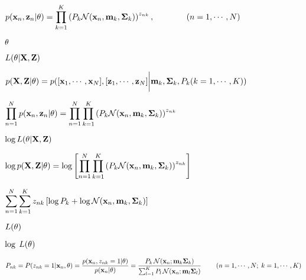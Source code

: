 \documentclass{article}
\def\lthtmlcheckvsize{\ifdim\ht\sizebox<\vsize 
  \ifdim\wd\sizebox<\hsize\expandafter\hfill\fi \expandafter\vfill
  \else\expandafter\vss\fi}%
\begin{document}
{\newpage\clearpage
{}%
$\displaystyle p({\bf x}_n,{\bf z}_n|\theta)=\prod_{k=1}^K
\left(P_k {\cal N}({\bf x}_n,{\bf m}_k,{\bf\Sigma}_k)\right)^{z_{nk}},
\;\;\;\;\;\;\;\;\;\;\;\;\;\;(n=1,\cdots,N)$%
\lthtmlindisplaymathZ
\lthtmlcheckvsize\clearpage}

{\newpage\clearpage
{}%
$ {\bf\theta}$%
\lthtmlindisplaymathZ
\lthtmlcheckvsize\clearpage}

{\newpage\clearpage
{}%
$\displaystyle L(\theta|{\bf X},{\bf Z})$%
\lthtmlindisplaymathZ
\lthtmlcheckvsize\clearpage}

{\newpage\clearpage
{}%
$\displaystyle p({\bf X},{\bf Z}|\theta)
=p([{\bf x}_1,\cdots,{\bf x}_N],[{\bf z}_1,\cdots,{\bf z}_N]\bigg|{\bf m}_k,{\bf\Sigma}_k,P_k(k=1,\cdots,K))$%
\lthtmlindisplaymathZ
\lthtmlcheckvsize\clearpage}

{\newpage\clearpage
{}%
$\displaystyle \prod_{n=1}^N p({\bf x}_n,{\bf z}_n|\theta)
=\prod_{n=1}^N \prod_{k=1}^K \left(P_k{\cal N}({\bf x}_n,{\bf m}_k,{\bf\Sigma}_k)\right)^{z_{nk}}$%
\lthtmlindisplaymathZ
\lthtmlcheckvsize\clearpage}

{\newpage\clearpage
{}%
$\displaystyle \log L(\theta|{\bf X},{\bf Z})$%
\lthtmlindisplaymathZ
\lthtmlcheckvsize\clearpage}

{\newpage\clearpage
{}%
$\displaystyle \log p({\bf X},{\bf Z}|\theta)
=\log \left[ \prod_{n=1}^N \prod_{k=1}^K
\left(P_k{\cal N}({\bf x}_n,{\bf m}_k,{\bf\Sigma}_k)\right)^{z_{nk}}\right]$%
\lthtmlindisplaymathZ
\lthtmlcheckvsize\clearpage}

{\newpage\clearpage
{}%
$\displaystyle \sum_{n=1}^N \sum_{k=1}^K z_{nk}
\left[\log P_k+\log {\cal N}({\bf x}_n,{\bf m}_k,{\bf\Sigma}_k)\right]$%
\lthtmlindisplaymathZ
\lthtmlcheckvsize\clearpage}

{\newpage\clearpage
{}%
$ L({\bf\theta})$%
\lthtmlindisplaymathZ
\lthtmlcheckvsize\clearpage}

{\newpage\clearpage
{}%
$ \log\;L({\bf\theta})$%
\lthtmlindisplaymathZ
\lthtmlcheckvsize\clearpage}

{\newpage\clearpage
{}%
$\displaystyle P_{nk}=P(z_{nk}=1|{\bf x}_n,\theta)
=\frac{p({\bf x}_n,z_{nk}=1|\theta)}{p({\bf x}_n|\theta)}
=\frac{P_k\,{\cal N}({\bf x}_n;{\bf m}_k{\bf\Sigma}_k)}
{\sum_{l=1}^K P_l\,{\cal N}({\bf x}_n;{\bf m}_l{\bf\Sigma}_l)}
\;\;\;\;\;\;\;\;(n=1,\cdots,N;\;k=1,\cdots,K)$%
\lthtmlindisplaymathZ
\lthtmlcheckvsize\clearpage}
\end{document}

